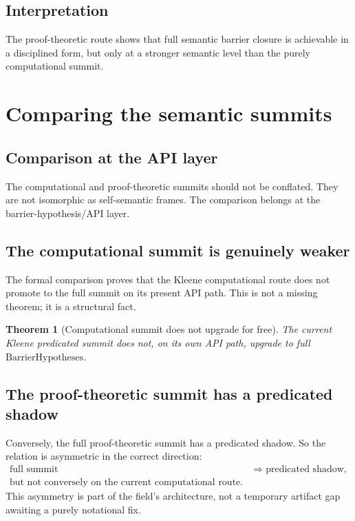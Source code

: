 \documentclass[11pt]{article}
\theoremstyle{plain}
\newtheorem{theorem}{Theorem}[section]
\theoremstyle{definition}
\theoremstyle{remark}
\begin{document}
\subsection{Interpretation}

The proof-theoretic route shows that full semantic barrier closure is achievable in a disciplined form, but only at a stronger semantic level than the purely computational summit.

\section{Comparing the semantic summits}

\subsection{Comparison at the API layer}

The computational and proof-theoretic summits should not be conflated. They are not isomorphic as self-semantic frames. The comparison belongs at the barrier-hypothesis/API layer.

\subsection{The computational summit is genuinely weaker}

The formal comparison proves that the Kleene computational route does not promote to the full summit on its present API path. This is not a missing theorem; it is a structural fact.

\begin{theorem}[Computational summit does not upgrade for free]
The current Kleene predicated summit does not, on its own API path, upgrade to full \(\mathrm{BarrierHypotheses}\).
\end{theorem}

\subsection{The proof-theoretic summit has a predicated shadow}

Conversely, the full proof-theoretic summit has a predicated shadow. So the relation is asymmetric in the correct direction:
\[
\begin{aligned}
\text{full summit} &\Longrightarrow \text{predicated shadow},\\
\text{but not conversely on the current computational route.} &
\end{aligned}
\]
This asymmetry is part of the field's architecture, not a temporary artifact gap awaiting a purely notational fix.
\end{document}
